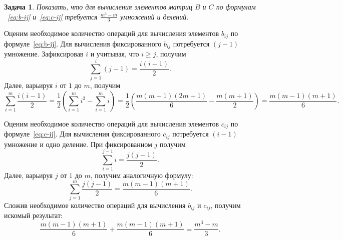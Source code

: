 \documentclass[11pt,a4paper,twoside]{report}
\numberwithin{equation}{section}
\newtheorem*{problem}{Задача}
\theoremstyle{definition}
\theoremstyle{plain}
\begin{document}
%
%
\begin{problem}
    Показать, что для вычисления элементов матриц $B$ и $C$ по формулам
   ~\eqref{eq:b-ij} и~\eqref{eq:c-ij} требуется $\frac{m^3-m}{3}$
    умножений и делений.
\end{problem}
%
%
\begin{solution}
    Оценим необходимое количество операций для вычисления элементов $b_{ij}$
    по формуле~\eqref{eq:b-ij}. Для вычисления фиксированного $b_{ij}$
    потребуется $(j-1)$ умножение.
    Зафиксировав $i$ и учитывая, что $i \geqslant j$, получим
    $$
        \sum_{j=1}^i(j-1) = \frac{i(i-1)}{2}.
    $$
    Далее, варьируя $i$ от $1$ до $m$, получим
    $$
        \sum_{i=1}^m \frac{i(i-1)}{2} = \frac{1}{2}\left(\sum_{i=1}^m i^2 -
            \sum_{i=1}^m i \right) = \frac{1}{2}\left(\frac{m(m+1)(2m+1)}{6} -
                \frac{m(m+1)}{2}\right) = \frac{m(m-1)(m+1)}{6}.
    $$

    Оценим необходимое количество операций для вычисления элементов $c_{ij}$
    по формуле~\eqref{eq:c-ij}. Для вычисления фиксированного $c_{ij}$
    потребуется $(i-1)$ умножение и одно деление.
    При фиксированном $j$ получим
    $$
        \sum_{i=1}^{j-1}i = \frac{j(j-1)}{2}.
    $$
    Далее, варьируя $j$ от $1$ до $m$, получим аналогичную формулу:
    $$
        \sum_{j=1}^m \frac{j(j-1)}{2} = \frac{m(m-1)(m+1)}{6}.
    $$
    Сложив необходимое количество операций для вычисления $b_{ij}$ и $c_{ij}$,
    получим искомый результат:
    $$
        \frac{m(m-1)(m+1)}{6} + \frac{m(m-1)(m+1)}{6} = \frac{m^3-m}{3}.
    $$
\end{solution}
%
%
\end{document}
